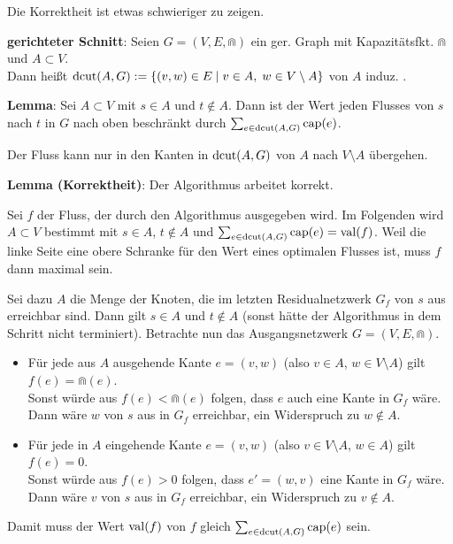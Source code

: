 \linie
\pagebreak

Die Korrektheit ist etwas schwieriger zu zeigen.

\textbf{gerichteter Schnitt}:
Seien $G = (V, E, \Cap)$ ein ger. Graph mit Kapazitätsfkt. $\Cap$ und $A \subset V$.\\
Dann heißt $\operatorname{dcut}(A, G) := \{(v, w) \in E \;|\; v \in A,\; w \in V \setminus A\}$
von $A$ induz. .

\textbf{Lemma}:
Sei $A \subset V$ mit $s \in A$ und $t \notin A$.
Dann ist der Wert jeden Flusses von $s$ nach $t$ in $G$ nach oben beschränkt durch
$\sum_{e \in \operatorname{dcut}(A, G)} \operatorname{cap}(e)$.

\begin{Beweis}
    Der Fluss kann nur in den Kanten in $\operatorname{dcut}(A, G)$ von $A$ nach $V \setminus A$
    übergehen.
\end{Beweis}

\textbf{Lemma (Korrektheit)}:
Der Algorithmus arbeitet korrekt.

\begin{Beweis}
    Sei $f$ der Fluss, der durch den Algorithmus ausgegeben wird.
    Im Folgenden wird $A \subset V$ bestimmt mit $s \in A$, $t \notin A$ und
    $\sum_{e \in \operatorname{dcut}(A, G)} \operatorname{cap}(e) = \operatorname{val}(f)$.
    Weil die linke Seite eine obere Schranke für den Wert eines optimalen Flusses ist,
    muss $f$ dann maximal sein.
    
    Sei dazu $A$ die Menge der Knoten, die im letzten Residualnetzwerk $G_f$ von $s$ aus
    erreichbar sind.
    Dann gilt $s \in A$ und $t \notin A$
    (sonst hätte der Algorithmus in dem Schritt nicht terminiert).
    Betrachte nun das Ausgangsnetzwerk $G = (V, E, \Cap)$.
    \begin{itemize}
        \item
        Für jede aus $A$ ausgehende Kante $e = (v, w)$ (also $v \in A$, $w \in V \setminus A$)
        gilt $f(e) = \Cap(e)$.\\
        Sonst würde aus $f(e) < \Cap(e)$ folgen, dass $e$ auch eine Kante in $G_f$ wäre.
        Dann wäre $w$ von $s$ aus in $G_f$ erreichbar, ein Widerspruch zu $w \notin A$.
        
        \item
        Für jede in $A$ eingehende Kante $e = (v, w)$ (also $v \in V \setminus A$, $w \in A$)
        gilt $f(e) = 0$.\\
        Sonst würde aus $f(e) > 0$ folgen, dass $e' = (w, v)$ eine Kante in $G_f$ wäre.
        Dann wäre $v$ von $s$ aus in $G_f$ erreichbar, ein Widerspruch zu $v \notin A$.
    \end{itemize}
    Damit muss der Wert $\operatorname{val}(f)$ von $f$ gleich $\sum_{e \in \operatorname{dcut}(A, G)} \operatorname{cap}(e)$ sein.
\end{Beweis}

